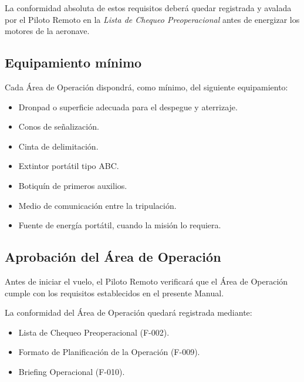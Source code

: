 La conformidad absoluta de estos requisitos deberá quedar registrada y avalada por el Piloto Remoto en la \textit{Lista de Chequeo Preoperacional} antes de energizar los motores de la aeronave.

\subsection{Equipamiento mínimo}

Cada Área de Operación dispondrá, como mínimo, del siguiente equipamiento:

\begin{itemize}

\item Dronpad o superficie adecuada para el despegue y aterrizaje.

\item Conos de señalización.

\item Cinta de delimitación.

\item Extintor portátil tipo ABC.

\item Botiquín de primeros auxilios.

\item Medio de comunicación entre la tripulación.

\item Fuente de energía portátil, cuando la misión lo requiera.

\end{itemize}


\subsection{Aprobación del Área de Operación}

Antes de iniciar el vuelo, el Piloto Remoto verificará que el Área de Operación cumple con los requisitos establecidos en el presente Manual.

La conformidad del Área de Operación quedará registrada mediante:

\begin{itemize}

\item Lista de Chequeo Preoperacional (F-002).

\item Formato de Planificación de la Operación (F-009).

\item Briefing Operacional (F-010).

\end{itemize}

